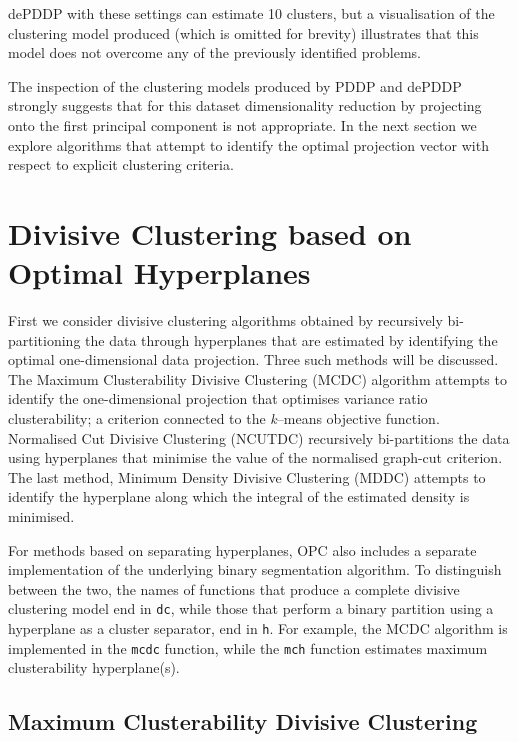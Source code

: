 \documentclass{book}
\begin{document}
%

\noindent
%
dePDDP with these settings can estimate
10 clusters, but a visualisation of the clustering model produced (which is
omitted for brevity) illustrates that this model does not overcome any of
the previously identified problems.


The inspection of the clustering models produced by PDDP and dePDDP strongly
suggests that for this dataset dimensionality reduction by projecting onto the
first principal component is not appropriate.
%
In the next section we explore algorithms that attempt to identify the optimal
projection vector with respect to explicit clustering criteria.
%

\section{Divisive Clustering based on Optimal Hyperplanes}

First we consider divisive clustering algorithms obtained by recursively
bi-partitioning the data through hyperplanes that are estimated by identifying
the optimal one-dimensional data projection. Three such methods will be
discussed.  The Maximum Clusterability Divisive Clustering (MCDC) algorithm
attempts to identify the one-dimensional projection that optimises variance
ratio clusterability; a criterion connected to the {\it k}--means objective
function. Normalised Cut Divisive Clustering (NCUTDC) recursively bi-partitions the data using hyperplanes
that minimise the value of the normalised graph-cut criterion.
The last method, Minimum Density Divisive Clustering (MDDC) attempts
to identify the hyperplane along which the integral of the estimated density is
minimised.


For methods based on separating hyperplanes, OPC also includes a separate
implementation of the underlying binary segmentation algorithm. To distinguish between the two,
the names of functions that produce a complete divisive clustering model end in {\tt dc},
while those that perform a binary partition using a hyperplane as a
cluster separator, end in {\tt h}.
%
For example, the MCDC algorithm is implemented in the {\tt mcdc} function,
while the {\tt mch} function estimates maximum clusterability
hyperplane(s).



\subsection{Maximum Clusterability Divisive Clustering}
\end{document}
